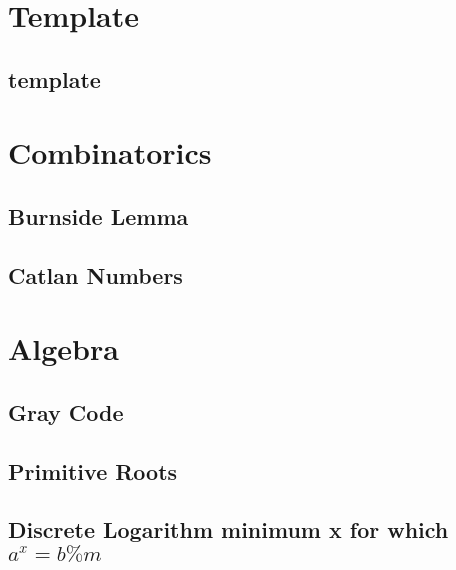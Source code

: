 \section{Template}
\subsection{template}
\vspace{-2ex}
\raggedbottom
\vspace{-3.2ex}
\hrulefill

\section{Combinatorics}
\subsection{Burnside Lemma}
\vspace{-2ex}
\raggedbottom
\vspace{-3.2ex}
\hrulefill
\subsection{Catlan Numbers}
\vspace{-2ex}
\raggedbottom
\vspace{-3.2ex}
\hrulefill

\section{Algebra}
\subsection{Gray Code}
\vspace{-2ex}
\raggedbottom
\vspace{-3.2ex}
\hrulefill
\subsection{Primitive Roots}
\vspace{-2ex}
\raggedbottom
\vspace{-3.2ex}
\hrulefill
\subsection{Discrete Logarithm minimum x for which ${a^x = b \% m}$}
\vspace{-2ex}
\raggedbottom
\vspace{-3.2ex}
\hrulefill
